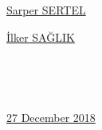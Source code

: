 \documentclass[a4paper,12pt]{article}
\begin{document}
\begin{minipage}[b]{0.495\linewidth}
\centering
\underline{Sarper SERTEL}
\end{minipage}%
\begin{minipage}[b]{0.495\linewidth}
\centering
\underline{İlker SAĞLIK}
\end{minipage}\\[2.5cm]

\begin{minipage}[b]{0.745\linewidth}
\centering
~~
\end{minipage}%
\begin{minipage}[b]{0.25\linewidth}
\centering
\underline{27 December 2018}
\end{minipage}



	
	
	
\end{document}

